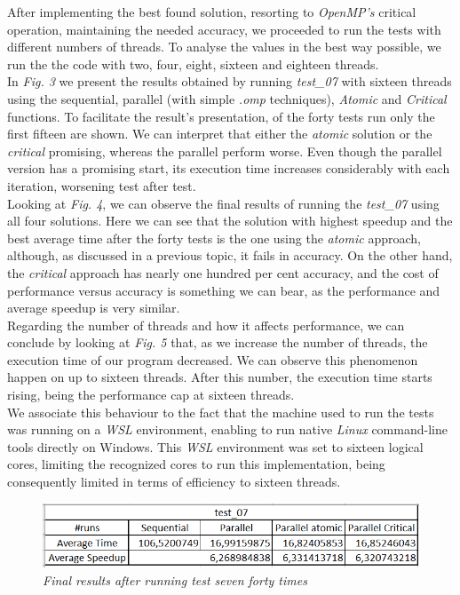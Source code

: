 \documentclass[10pt,journal,compsoc]{IEEEtran}
\begin{document}
After implementing the best found solution, resorting to {\itshape OpenMP's} critical operation, maintaining the needed accuracy, we proceeded to run the tests with different numbers of threads. To analyse the values in the best way possible, we run the the code with two, four, eight, sixteen and eighteen threads.
\\In {\itshape Fig. 3} we present the results obtained by running {\itshape test\_07} with sixteen threads using the sequential, parallel (with simple {\itshape .omp} techniques), {\itshape Atomic} and {\itshape Critical} functions. To facilitate the result's presentation, of the forty tests run only the first fifteen are shown. We can interpret that either the {\itshape atomic} solution or the {\itshape critical} promising, whereas the parallel perform worse. Even though the parallel version has a promising start, its execution time increases considerably with each iteration, worsening test after test. 
\\Looking at {\itshape Fig. 4}, we can observe the final results of running the {\itshape test\_07} using all four solutions. Here we can see that the solution with highest speedup and the best average time after the forty tests is the one using the {\itshape atomic} approach, although, as discussed in a previous topic, it fails in accuracy. On the other hand, the {\itshape critical} approach has nearly one hundred per cent accuracy, and the cost of performance versus accuracy is something we can bear, as the performance and average speedup is very similar.
\\Regarding the number of threads and how it affects performance, we can conclude by looking at {\itshape Fig. 5} that, as we increase the number of threads, the execution time of our program decreased. We can observe this phenomenon happen on up to sixteen threads. After this number, the execution time starts rising, being the performance cap at sixteen threads.
\\We associate this behaviour to the fact that the machine used to run the tests was running on a {\itshape WSL} environment, enabling to run native {\itshape Linux} command-line tools directly on Windows. This {\itshape WSL} environment was set to sixteen logical cores, limiting the recognized cores to run this implementation, being consequently limited in terms of efficiency to sixteen threads.

\begin{figure}
    \centering
    \includegraphics[scale=0.35]{test_07_final.png}
    \caption{\itshape{Final results after running test seven forty times}}
    \label{fig:my_label}
\end{figure}
\end{document}
